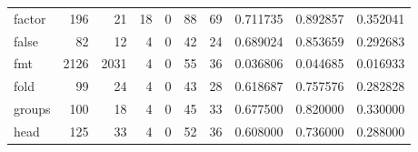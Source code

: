 \begin{tabular}{lrrrrrrrrr}
factor    &                                                196 &                                                 21 &                                                 18 &                                                  0 &                                                 88 &                                                 69 &                                           0.711735 &                               0.892857 &                             0.352041 \\
false     &                                                 82 &                                                 12 &                                                  4 &                                                  0 &                                                 42 &                                                 24 &                                           0.689024 &                               0.853659 &                             0.292683 \\
fmt       &                                               2126 &                                               2031 &                                                  4 &                                                  0 &                                                 55 &                                                 36 &                                           0.036806 &                               0.044685 &                             0.016933 \\
fold      &                                                 99 &                                                 24 &                                                  4 &                                                  0 &                                                 43 &                                                 28 &                                           0.618687 &                               0.757576 &                             0.282828 \\
groups    &                                                100 &                                                 18 &                                                  4 &                                                  0 &                                                 45 &                                                 33 &                                           0.677500 &                               0.820000 &                             0.330000 \\
head      &                                                125 &                                                 33 &                                                  4 &                                                  0 &                                                 52 &                                                 36 &                                           0.608000 &                               0.736000 &                             0.288000 \\

\end{tabular}
